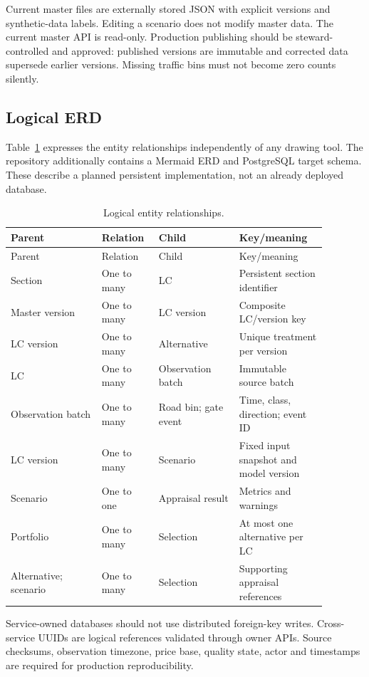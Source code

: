 \documentclass[11pt,a4paper]{article}
\begin{document}
Current master files are externally stored JSON with explicit versions and synthetic-data labels. Editing a scenario does not modify master data. The current master API is read-only. Production publishing should be steward-controlled and approved: published versions are immutable and corrected data supersede earlier versions. Missing traffic bins must not become zero counts silently.

\subsection{Logical ERD}
Table~\ref{tab:erd} expresses the entity relationships independently of any drawing tool. The repository additionally contains a Mermaid ERD and PostgreSQL target schema. These describe a planned persistent implementation, not an already deployed database.
\begin{longtable}{p{0.26\linewidth}p{0.14\linewidth}p{0.23\linewidth}p{0.25\linewidth}}
\caption{Logical entity relationships.}\label{tab:erd}\\\toprule
Parent & Relation & Child & Key/meaning\\\midrule\endfirsthead
\toprule Parent & Relation & Child & Key/meaning\\\midrule\endhead
Section & One to many & LC & Persistent section identifier\\
Master version & One to many & LC version & Composite LC/version key\\
LC version & One to many & Alternative & Unique treatment per version\\
LC & One to many & Observation batch & Immutable source batch\\
Observation batch & One to many & Road bin; gate event & Time, class, direction; event ID\\
LC version & One to many & Scenario & Fixed input snapshot and model version\\
Scenario & One to one & Appraisal result & Metrics and warnings\\
Portfolio & One to many & Selection & At most one alternative per LC\\
Alternative; scenario & One to many & Selection & Supporting appraisal references\\\bottomrule
\end{longtable}
Service-owned databases should not use distributed foreign-key writes. Cross-service UUIDs are logical references validated through owner APIs. Source checksums, observation timezone, price base, quality state, actor and timestamps are required for production reproducibility.
\end{document}
